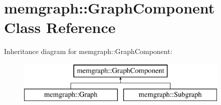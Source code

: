 \hypertarget{classmemgraph_1_1_graph_component}{}\section{memgraph\+:\+:Graph\+Component Class Reference}
\label{classmemgraph_1_1_graph_component}
Inheritance diagram for memgraph\+:\+:Graph\+Component\+:\begin{figure}[H]
\begin{center}
\leavevmode
\includegraphics[height=2.000000cm]{classmemgraph_1_1_graph_component}
\end{center}
\end{figure}
